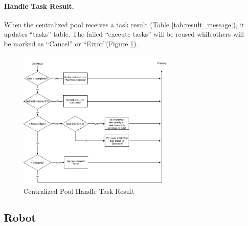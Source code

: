 \paragraph{Handle Task Result.}
When the centralized pool receives a task result (Table \ref{tab:result_message}), it updates ``tasks'' table. The failed ``execute tasks'' will be reused whileothers will be marked as ``Cancel'' or ``Error''(Figure \ref{fig:centralized_task_handle}).

\begin{figure}[htbp]
    \centering
    \includegraphics[width = 0.7\textwidth]{content/images/ch4/centralized_task_result.drawio.png}
    \caption{Centralized Pool Handle Task Result}
    \label{fig:centralized_task_handle}
\end{figure}


\subsection{Robot}

